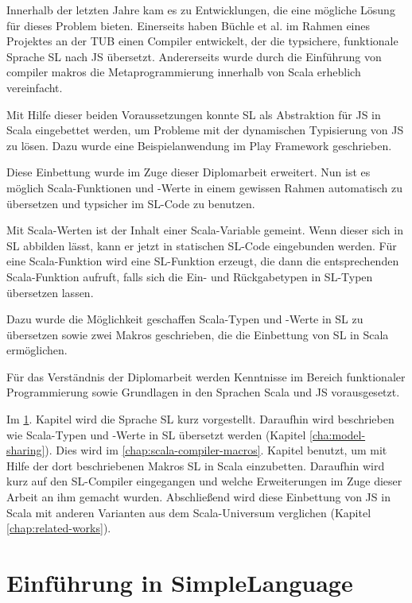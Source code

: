 \documentclass[12pt,bibtotoc]{scrreprt}
\begin{document}
Innerhalb der letzten Jahre kam es zu Entwicklungen, die eine mögliche Lösung für dieses Problem bieten. Einerseits haben Büchle et al. im Rahmen eines Projektes an der \ac{TUB} einen Compiler entwickelt, der die typsichere, funktionale Sprache \ac{SL} nach JS übersetzt\cite{Buchle2013}. Andererseits wurde durch die Einführung von compiler makros \cite{Burmako2013} die Metaprogrammierung innerhalb von Scala erheblich vereinfacht.

Mit Hilfe dieser beiden Voraussetzungen konnte SL als Abstraktion für JS in Scala eingebettet werden\cite{Hoger2013}, um Probleme mit der dynamischen Typisierung von JS zu lösen. Dazu wurde eine Beispielanwendung im Play Framework geschrieben\cite{Play1}. 

Diese Einbettung wurde im Zuge dieser Diplomarbeit erweitert. Nun ist es  möglich Scala-Funktionen und -Werte in einem gewissen Rahmen automatisch zu übersetzen und typsicher im SL-Code zu benutzen. 

Mit Scala-Werten ist der Inhalt einer Scala-Variable gemeint. Wenn dieser sich in SL abbilden lässt, kann er jetzt in statischen SL-Code eingebunden werden. Für eine Scala-Funktion wird eine SL-Funktion erzeugt, die dann die entsprechenden Scala-Funktion aufruft, falls sich die Ein- und Rückgabetypen in SL-Typen übersetzen lassen.

Dazu wurde die Möglichkeit geschaffen Scala-Typen und -Werte in SL zu übersetzen sowie zwei Makros geschrieben, die die Einbettung von SL in Scala ermöglichen. 

Für das Verständnis der Diplomarbeit werden Kenntnisse im Bereich funktionaler Programmierung sowie Grundlagen in den Sprachen Scala und JS vorausgesetzt.

Im \ref{cha:sl-introduction}. Kapitel wird die Sprache SL kurz vorgestellt. Daraufhin wird beschrieben wie Scala-Typen und -Werte in SL übersetzt werden (Kapitel \ref{cha:model-sharing}). Dies wird im \ref{chap:scala-compiler-macros}. Kapitel benutzt, um mit Hilfe der dort beschriebenen Makros SL in Scala einzubetten. Daraufhin wird kurz auf den SL-Compiler eingegangen und welche Erweiterungen im Zuge dieser Arbeit an ihm gemacht wurden. Abschließend wird diese Einbettung von JS in Scala mit anderen Varianten aus dem Scala-Universum verglichen (Kapitel \ref{chap:related-works}). 

\chapter{Einführung in SimpleLanguage}
\label{cha:sl-introduction}
\end{document}
